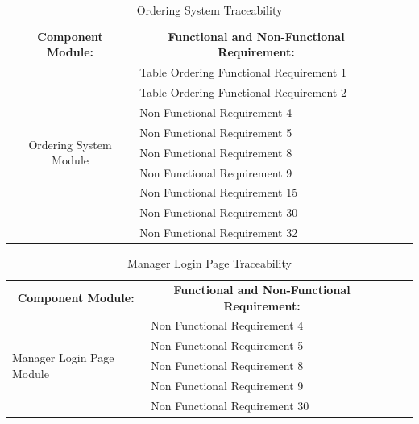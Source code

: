 \documentclass [10pt]{article}
\begin{document}
\begin{table}[h!]
\centering
\begin{tabular}{lllll}
\cline{1-2}
\multicolumn{1}{|c|}{\textbf{Component Module:}} & \multicolumn{1}{c|}{\textbf{Functional and Non-Functional Requirement:}} &  &  &  \\ \cline{1-2}
\multicolumn{1}{|c|}{\multirow{9}{*}{Ordering System Module}} & \multicolumn{1}{l|}{Table Ordering Functional Requirement 1} &  &  &  \\ \cline{2-2}
\multicolumn{1}{|c|}{} & \multicolumn{1}{l|}{Table Ordering Functional Requirement 2} &  &  &  \\ \cline{2-2}
\multicolumn{1}{|c|}{} & \multicolumn{1}{l|}{Non Functional Requirement 4} &  &  &  \\ \cline{2-2}
\multicolumn{1}{|c|}{} & \multicolumn{1}{l|}{Non Functional Requirement 5} &  &  &  \\ \cline{2-2}
\multicolumn{1}{|c|}{} & \multicolumn{1}{l|}{Non Functional Requirement 8} &  &  &  \\ \cline{2-2}
\multicolumn{1}{|c|}{} & \multicolumn{1}{l|}{Non Functional Requirement 9} &  &  &  \\ \cline{2-2}
\multicolumn{1}{|c|}{} & \multicolumn{1}{l|}{Non Functional Requirement 15} &  &  &  \\ \cline{2-2}
\multicolumn{1}{|c|}{} & \multicolumn{1}{l|}{Non Functional Requirement 30} &  &  &  \\ \cline{2-2}
\multicolumn{1}{|c|}{} & \multicolumn{1}{l|}{Non Functional Requirement 32} &  &  &  \\ \cline{1-2}
\end{tabular}
\caption{Ordering System Traceability}
\end{table}



\begin{table}[h!]
\centering
\begin{tabular}{lllll}
\cline{1-2}
\multicolumn{1}{|c|}{\textbf{Component Module:}} & \multicolumn{1}{c|}{\textbf{Functional and Non-Functional Requirement:}} &  &  &  \\ \cline{1-2}
\multicolumn{1}{|l|}{\multirow{5}{*}{Manager Login Page Module}} & \multicolumn{1}{l|}{Non Functional Requirement 4} &  &  &  \\ \cline{2-2}
\multicolumn{1}{|l|}{} & \multicolumn{1}{l|}{Non Functional Requirement 5} &  &  &  \\ \cline{2-2}
\multicolumn{1}{|l|}{} & \multicolumn{1}{l|}{Non Functional Requirement 8} &  &  &  \\ \cline{2-2}
\multicolumn{1}{|l|}{} & \multicolumn{1}{l|}{Non Functional Requirement 9} &  &  &  \\ \cline{2-2}
\multicolumn{1}{|l|}{} & \multicolumn{1}{l|}{Non Functional Requirement 30} &  &  &  \\ \cline{1-2}
\end{tabular}
\caption{Manager Login Page Traceability}
\end{table}
\end{document}
